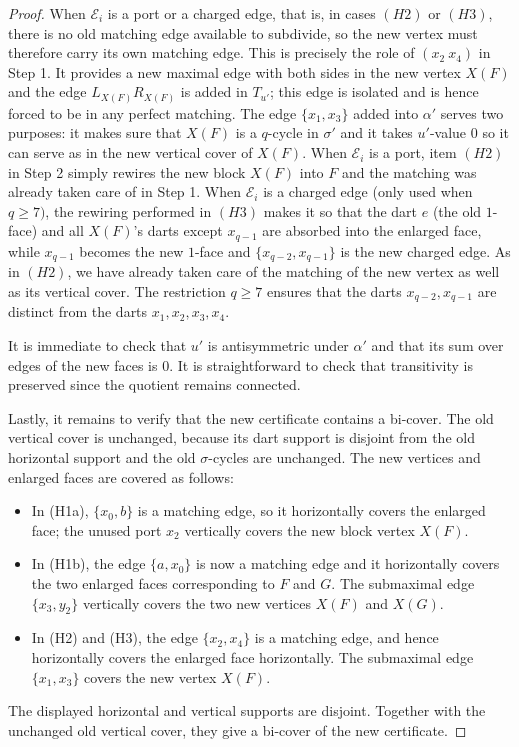 \documentclass[11pt]{article}
\theoremstyle{remark}
\newcommand{\cE}{\mathcal E}
\begin{document}
\begin{proof}
When $\cE_i$ is a port or a charged edge, that is, in cases $(H2)$ or $(H3)$, there is no old matching edge available to subdivide, so the new
vertex must therefore carry its own matching edge. This is precisely the role of $(x_2\ x_4)$ in Step 1. It provides a new maximal edge with both sides in the new vertex $X(F)$ and the edge $L_{X(F)} R_{X(F)}$ is added in $T_{u'}$; this edge is isolated and is hence forced to be in any perfect matching. The edge $\{x_1, x_3\}$ added into $\alpha'$ serves two purposes: it makes sure that $X(F)$ is a $q$-cycle in $\sigma'$ and it takes $u'$-value $0$ so it can serve as in the new vertical cover of $X(F)$. When $\cE_i$ is a port, item $(H2)$ in Step 2 simply rewires the new block $X(F)$ into $F$ and the matching was already taken care of in Step 1. When $\cE_i$ is a charged edge (only used when $q\geq 7)$, the rewiring performed in $(H3)$ makes it so that the dart $e$ (the old $1$-face) and all $X(F)$'s darts except $x_{q-1}$ are absorbed into the enlarged face, while $x_{q-1}$ becomes the
new $1$-face and $\{x_{q-2}, x_{q-1}\}$ is the new charged edge. As in $(H2)$, we have already taken care of the matching of the new vertex as well as its vertical cover. The restriction $q\ge7$ ensures that the darts
$x_{q-2},x_{q-1}$ are distinct from the darts $x_1,x_2,x_3,x_4$. 



It is immediate to check that $u'$ is antisymmetric under $\alpha'$ and that its sum over edges of the new faces is $0$. %
It is straightforward to check that transitivity is preserved since the quotient remains connected. 

Lastly, it remains to verify that the new certificate contains a bi-cover. The old vertical cover is unchanged,
because its dart support is disjoint from the old horizontal support and the
old $\sigma$-cycles are unchanged.  The new vertices and enlarged faces are covered as follows:
\begin{itemize}[leftmargin=2.2em]
\item In (H1a), $\{x_0,b\}$ is a matching edge, so it horizontally covers the
enlarged face; the unused port $x_2$ vertically covers the new block vertex $X(F)$.
\item In (H1b), the edge $\{a,x_0\}$ is now a matching edge and it horizontally covers the two enlarged faces corresponding to $F$ and $G$.  The submaximal edge
$\{x_3,y_2\}$ vertically covers the two new vertices $X(F)$ and $X(G)$.
\item In (H2) and (H3), the edge $\{x_2,x_4\}$ is a matching edge, and hence
horizontally covers the enlarged face horizontally. The submaximal edge
$\{x_1,x_3\}$ covers the new vertex $X(F)$.
\end{itemize}
The displayed horizontal and vertical supports are disjoint.  Together with
the unchanged old vertical cover, they give a bi-cover of the new
certificate.
\end{proof}
\end{document}
